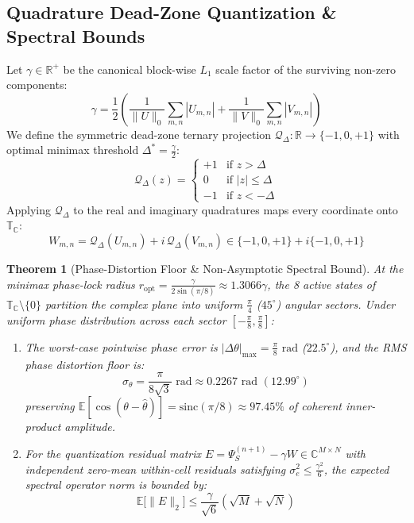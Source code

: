 \documentclass[10pt, twocolumn, a4paper]{article}
\newtheorem{theorem}{Theorem}
\begin{document}
\subsection{Quadrature Dead-Zone Quantization \& Spectral Bounds}
Let $\gamma \in \mathbb{R}^+$ be the canonical block-wise $L_1$ scale factor of the surviving non-zero components:
\begin{equation}
\gamma = \frac{1}{2} \left( \frac{1}{\|U\|_0} \sum_{m,n} |U_{m,n}| + \frac{1}{\|V\|_0} \sum_{m,n} |V_{m,n}| \right)
\end{equation}
We define the symmetric dead-zone ternary projection $\mathcal{Q}_{\Delta} : \mathbb{R} \to \{-1, 0, +1\}$ with optimal minimax threshold $\Delta^* = \frac{\gamma}{2}$:
\begin{equation}
\mathcal{Q}_{\Delta}(z) = \begin{cases} +1 & \text{if } z > \Delta \\ 0 & \text{if } |z| \le \Delta \\ -1 & \text{if } z < -\Delta \end{cases}
\end{equation}
Applying $\mathcal{Q}_{\Delta}$ to the real and imaginary quadratures maps every coordinate onto $\mathbb{T}_{\mathbb{C}}$:
\begin{equation}
W_{m,n} = \mathcal{Q}_{\Delta}(U_{m,n}) + i \, \mathcal{Q}_{\Delta}(V_{m,n}) \in \{-1, 0, +1\} + i\{-1, 0, +1\}
\end{equation}

\begin{theorem}[Phase-Distortion Floor \& Non-Asymptotic Spectral Bound]
At the minimax phase-lock radius $r_{\text{opt}} = \frac{\gamma}{2\sin(\pi/8)} \approx 1.3066\gamma$, the 8 active states of $\mathbb{T}_{\mathbb{C}} \setminus \{0\}$ partition the complex plane into uniform $\frac{\pi}{4}$ ($45^\circ$) angular sectors. Under uniform phase distribution across each sector $[-\frac{\pi}{8}, \frac{\pi}{8}]$:
\begin{enumerate}
    \item The worst-case pointwise phase error is $|\Delta\theta|_{\max} = \frac{\pi}{8}\text{ rad}$ ($22.5^\circ$), and the RMS phase distortion floor is:
    \begin{equation}
    \sigma_{\theta} = \frac{\pi}{8\sqrt{3}}\text{ rad} \approx 0.2267\text{ rad } (12.99^\circ)
    \end{equation}
    preserving $\mathbb{E}[\cos(\theta - \hat{\theta})] = \text{sinc}(\pi/8) \approx 97.45\%$ of coherent inner-product amplitude.
    \item For the quantization residual matrix $E = \Psi_S^{(n+1)} - \gamma W \in \mathbb{C}^{M \times N}$ with independent zero-mean within-cell residuals satisfying $\sigma_e^2 \le \frac{\gamma^2}{6}$, the expected spectral operator norm is bounded by:
    \begin{equation}
    \mathbb{E}\big[\|E\|_2\big] \le \frac{\gamma}{\sqrt{6}}\left(\sqrt{M} + \sqrt{N}\right)
    \end{equation}
\end{enumerate}
\end{theorem}
\end{document}
